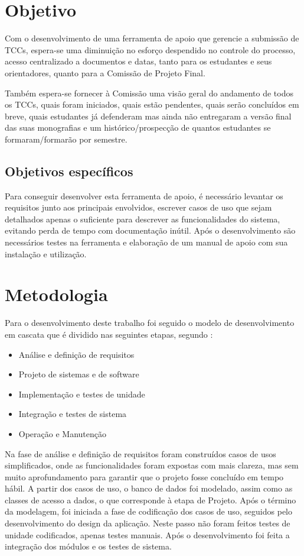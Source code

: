 \section{Objetivo}
Com o desenvolvimento de uma ferramenta de apoio que gerencie a submissão de TCCs, espera-se
uma diminuição no esforço despendido no controle do processo, acesso centralizado a documentos e
datas, tanto para os estudantes e seus orientadores, quanto para a Comissão de Projeto Final.

Também espera-se fornecer à Comissão uma visão geral do andamento de todos os TCCs, quais foram
iniciados, quais estão pendentes, quais serão concluídos em breve, quais estudantes já
defenderam mas ainda não entregaram a versão final das suas monografias e um histórico/prospecção
de quantos estudantes se formaram/formarão por semestre.

\subsection{Objetivos específicos}
Para conseguir desenvolver esta ferramenta de apoio, é necessário levantar os requisitos
junto aos principais envolvidos, escrever casos de uso que sejam detalhados apenas o suficiente
para descrever as funcionalidades do sistema, evitando perda de tempo com documentação inútil. 
Após o desenvolvimento são necessários testes na ferramenta e elaboração de um manual de 
apoio com sua instalação e utilização.

\section{Metodologia}

Para o desenvolvimento deste trabalho foi seguido o modelo de desenvolvimento em cascata que é
dividido nas seguintes etapas, segundo \cite{sommerville:2003}:
\begin{itemize}
\item Análise e definição de requisitos 
\item Projeto de sistemas e de software 
\item Implementação e testes de unidade 
\item Integração e testes de sistema 
\item Operação e Manutenção 
\end{itemize}
 
Na fase de análise e definição de requisitos foram construídos casos de usos 
simplificados, onde as funcionalidades foram expostas com mais clareza, mas sem 
muito aprofundamento para garantir que o projeto fosse concluído em tempo hábil.
A partir dos casos de uso, o banco de dados foi modelado, assim como as classes 
de acesso a dados, o que corresponde à etapa de Projeto. Após o término da modelagem,
foi iniciada a fase de codificação dos casos de uso, seguidos pelo desenvolvimento 
do design da aplicação. Neste passo não foram feitos testes de unidade codificados,
apenas testes manuais. Após o desenvolvimento foi feita a integração dos módulos 
e os testes de sistema.

